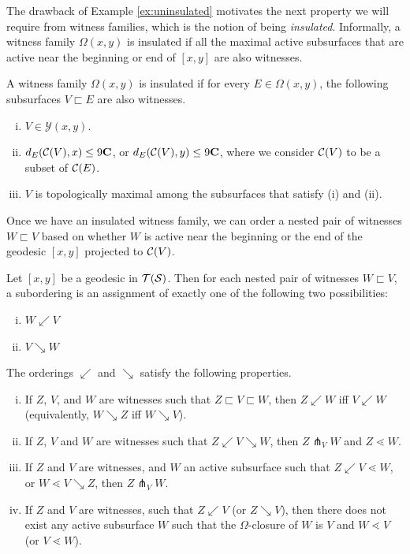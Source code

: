 \documentclass[12pt, reqno]{amsart}
\begin{document}
  The drawback of Example \ref{ex:uninsulated} motivates the next property we will require from witness families, which is the notion of being \emph{insulated}.
  Informally, a witness family $\Omega(x,y)$ is insulated if all the maximal active subsurfaces that are active near the beginning or end of $[x,y]$ are also witnesses.
  \begin{definition}
    \label{def:insulated}
    A witness family $\Omega(x,y)$ is insulated if for every $E \in \Omega(x,y)$, the following subsurfaces $V \sqsubset E$ are also witnesses.
    \begin{enumerate}[(i)]
    \item $V \in \mathcal{Y}(x,y)$.
    \item $d_E(\mathcal{C}(V), x) \leq 9\mathbf{C}$, or $d_E(\mathcal{C}(V), y) \leq 9 \mathbf{C}$, where we consider $\mathcal{C}(V)$ to be a subset of $\mathcal{C}(E)$.
    \item $V$ is topologically maximal among the subsurfaces that satisfy (i) and (ii).
    \end{enumerate}
  \end{definition}

  Once we have an insulated witness family, we can order a nested pair of witnesses $W \sqsubset V$ based on whether $W$ is active near the beginning or the end of the geodesic $[x,y]$ projected to $\mathcal{C}(V)$.

  \begin{definition}[Subordering]
    Let $[x,y]$ be a geodesic in $\mathcal{T}(\mathcal{S})$.
    Then for each nested pair of witnesses $W \sqsubset V$, a subordering is an assignment of exactly one of the following two possibilities:
    \begin{enumerate}[(i)]
    \item $W \swarrow V$
    \item $V \searrow W$
    \end{enumerate}
    The orderings $\swarrow$ and $\searrow$ satisfy the following properties.
    \begin{enumerate}[(i)]
    \item If $Z$, $V$, and $W$ are witnesses such that $Z \sqsubset V \sqsubset W$, then $Z \swarrow W$ iff $V \swarrow W$ (equivalently, $W \searrow Z$ iff $W \searrow V$).
    \item If $Z$, $V$ and $W$ are witnesses such that $Z \swarrow V \searrow W$, then $Z \pitchfork_V W$ and $Z \lessdot W$. 
    \item If $Z$ and $V$ are witnesses, and $W$ an active subsurface such that $Z \swarrow V \lessdot W$, or $W \lessdot V \searrow Z$, then $Z \pitchfork_V W$.
    \item If $Z$ and $V$ are witnesses, such that $Z \swarrow V$ (or $Z \searrow V$), then there does not exist any active subsurface $W$ such that the $\Omega$-closure of $W$ is $V$ and $W \lessdot V$ (or $V \lessdot W$).
    \end{enumerate}
  \end{definition}
\end{document}
